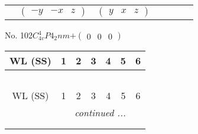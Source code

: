\documentclass[fleqn,9pt,landscape]{jsarticle}
\begin{document}
\begin{center}
\begin{longtable}{ccccccc}
& $ \begin{pmatrix} - y & - x & z \end{pmatrix} $ & $ \begin{pmatrix} y & x & z \end{pmatrix} $ & $  $ & $  $ & $  $ & $  $ \\
\end{longtable}
\end{center}
\newpage
No. 102\quad$C_{4v}^{4}$\quad$P4_2nm$\quad[ tetragonal ]\quad$+\begin{pmatrix} 0 & 0 & 0 \end{pmatrix}$
\begin{center}
\renewcommand{\arraystretch}{1.2}
\begin{longtable}{ccccccc}
 \hline \hline
WL (SS) & 1 & 2 & 3 & 4 & 5 & 6 \\ \hline \endfirsthead

\multicolumn{6}{l}{\tablename\ \thetable{}} \\
 \hline \hline
WL (SS) & 1 & 2 & 3 & 4 & 5 & 6 \\ \hline \endhead

 \hline \hline
\multicolumn{6}{r}{\footnotesize\it continued ...} \\ \endfoot

 \hline \hline
\multicolumn{6}{r}{} \\ \endlastfoot


\end{longtable}
\end{center}
\end{document}

